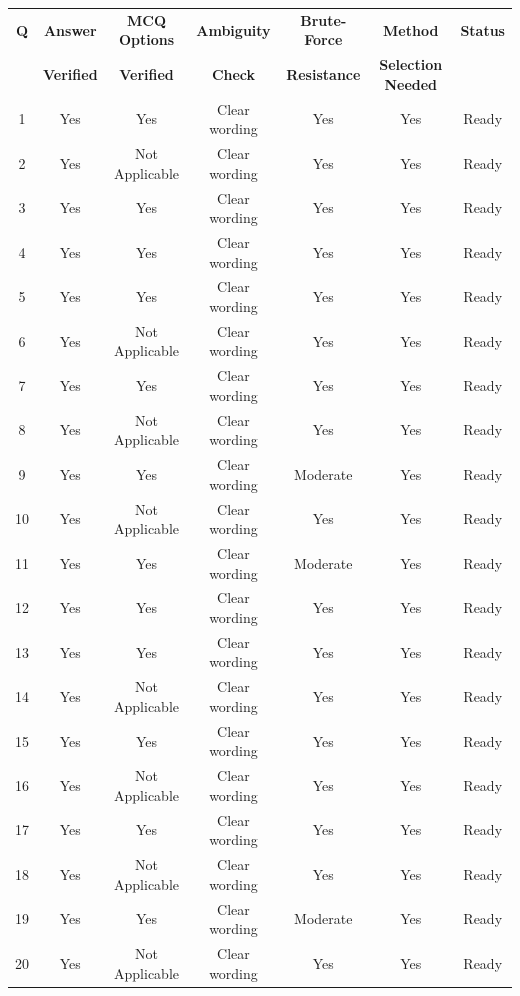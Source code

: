 \documentclass[11pt]{article}
\begin{document}
\begin{longtable}{|c|c|c|c|c|c|c|}
\hline
\textbf{Q} & \textbf{Answer} & \textbf{MCQ Options} & \textbf{Ambiguity} & \textbf{Brute-Force} & \textbf{Method} & \textbf{Status} \\
 & \textbf{Verified} & \textbf{Verified} & \textbf{Check} & \textbf{Resistance} & \textbf{Selection Needed} & \\
\hline
1 & Yes & Yes & Clear wording & Yes & Yes & Ready \\
\hline
2 & Yes & Not Applicable & Clear wording & Yes & Yes & Ready \\
\hline
3 & Yes & Yes & Clear wording & Yes & Yes & Ready \\
\hline
4 & Yes & Yes & Clear wording & Yes & Yes & Ready \\
\hline
5 & Yes & Yes & Clear wording & Yes & Yes & Ready \\
\hline
6 & Yes & Not Applicable & Clear wording & Yes & Yes & Ready \\
\hline
7 & Yes & Yes & Clear wording & Yes & Yes & Ready \\
\hline
8 & Yes & Not Applicable & Clear wording & Yes & Yes & Ready \\
\hline
9 & Yes & Yes & Clear wording & Moderate & Yes & Ready \\
\hline
10 & Yes & Not Applicable & Clear wording & Yes & Yes & Ready \\
\hline
11 & Yes & Yes & Clear wording & Moderate & Yes & Ready \\
\hline
12 & Yes & Yes & Clear wording & Yes & Yes & Ready \\
\hline
13 & Yes & Yes & Clear wording & Yes & Yes & Ready \\
\hline
14 & Yes & Not Applicable & Clear wording & Yes & Yes & Ready \\
\hline
15 & Yes & Yes & Clear wording & Yes & Yes & Ready \\
\hline
16 & Yes & Not Applicable & Clear wording & Yes & Yes & Ready \\
\hline
17 & Yes & Yes & Clear wording & Yes & Yes & Ready \\
\hline
18 & Yes & Not Applicable & Clear wording & Yes & Yes & Ready \\
\hline
19 & Yes & Yes & Clear wording & Moderate & Yes & Ready \\
\hline
20 & Yes & Not Applicable & Clear wording & Yes & Yes & Ready \\
\hline
\end{longtable}
\end{document}
